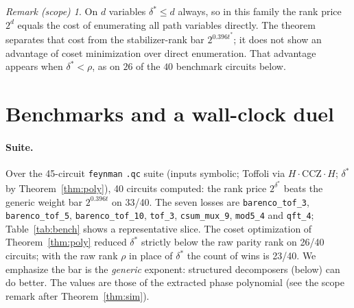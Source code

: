 \documentclass[11pt]{article}
\theoremstyle{definition}
\theoremstyle{remark}
\newtheorem*{scope}{Remark (scope)}
\newcommand{\ds}{\delta^{*}}
\newcommand{\ts}{t^{*}}
\newcommand{\code}[1]{\texttt{#1}}
\begin{document}
\begin{scope}
On $d$ variables $\ds\le d$ always, so in this family the rank price $2^{d}$ equals the cost of enumerating
all path variables directly. The theorem separates that cost from the stabilizer-rank bar $2^{0.396\ts}$; it
does not show an advantage of coset minimization over direct enumeration. That advantage appears when $\ds<\rho$, as
on $26$ of the $40$ benchmark circuits below.
\end{scope}

\section{Benchmarks and a wall-clock duel}\label{sec:bench}

\paragraph{Suite.} Over the 45-circuit \code{feynman} \code{.qc} suite (inputs symbolic; Toffoli via $H\cdot\mathrm{CCZ}\cdot H$; $\ds$ by
Theorem~\ref{thm:poly}), 40 circuits computed: the rank price $2^{\ds}$ beats the generic weight bar $2^{0.396t}$
on 33/40. The seven losses are \code{barenco\_tof\_3}, \code{barenco\_tof\_5}, \code{barenco\_tof\_10},
\code{tof\_3}, \code{csum\_mux\_9}, \code{mod5\_4} and \code{qft\_4}; Table~\ref{tab:bench} shows a representative slice. The coset
optimization of Theorem~\ref{thm:poly} reduced $\ds$ strictly below the raw parity rank on 26/40 circuits; with the raw
rank $\rho$ in place of $\ds$ the count of wins is 23/40.
We emphasize the bar is the \emph{generic} exponent: structured decomposers (below) can do better.
The values are those of the extracted phase polynomial (see the scope remark after Theorem~\ref{thm:sim}).
\end{document}

